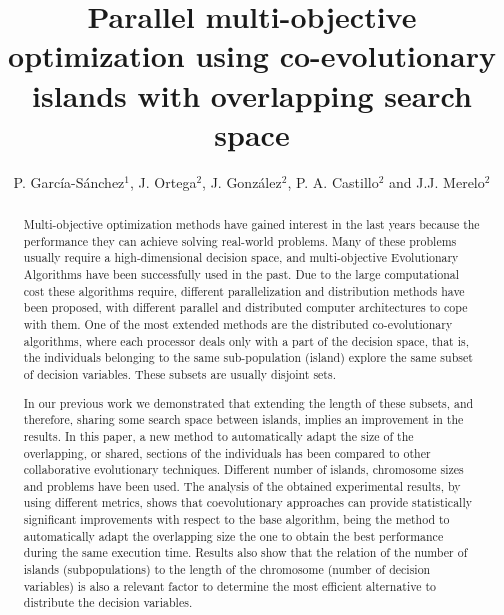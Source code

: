 \documentclass[preprint]{elsarticle}
\begin{document}
\begin{frontmatter}


\title{Parallel multi-objective optimization using co-evolutionary
  islands with overlapping search space}


\author{P. Garc\'ia-S\'anchez$^1$, J. Ortega$^2$, J. Gonz\'alez$^2$, P. A. Castillo$^2$ and J.J. Merelo$^2$}
\address{
$^1$ Department of Computer Science and Engineering. ESI. University of C\'adiz, Spain\\
$^2$ Department of Computer Architecture and Computer Technology.\\ ETSIIT - CITIC. University of Granada, Spain\\
}


\begin{abstract}
Multi-objective optimization methods have gained interest in the last years because the performance they can achieve solving real-world problems. Many of these problems usually require a high-dimensional decision space, and multi-objective Evolutionary Algorithms have been successfully used in the past. Due to the large computational cost these algorithms require, different parallelization and distribution methods have been proposed, with different parallel and distributed computer architectures to cope with them. One of the most extended methods are the distributed co-evolutionary algorithms, where each processor deals only with a part of the decision space, that is, the individuals belonging to the same sub-population (island) explore the same subset of decision variables. These subsets are usually disjoint sets.

In our previous work we demonstrated that extending the length of these subsets, and therefore, sharing some search space between islands, implies an improvement in the results. In this paper, a new method to automatically adapt the size of the overlapping, or shared, sections of the individuals has been compared to other collaborative evolutionary techniques. Different number of islands, chromosome sizes and problems have been used. The analysis of the obtained experimental results, by using different metrics, shows that coevolutionary approaches can provide statistically significant improvements with respect to the base algorithm, being the method to automatically adapt the overlapping size the one to obtain the best performance during the same execution time. Results also show that the relation of the number of islands (subpopulations) to the length of the chromosome (number of decision variables) is also a relevant factor to determine the most efficient alternative to distribute the decision variables.
\end{abstract}



\end{frontmatter}
\end{document}

